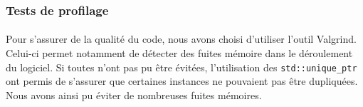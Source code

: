 \subsubsection{Tests de profilage}
\paragraph{}
Pour s'assurer de la qualité du code, nous avons choisi d'utiliser l'outil Valgrind. Celui-ci permet notamment de détecter des fuites mémoire dans le déroulement du logiciel. Si toutes n'ont pas pu être évitées, l'utilisation des \texttt{std::unique\_ptr} ont permis de s'assurer que certaines instances ne pouvaient pas être dupliquées. Nous avons ainsi pu éviter de nombreuses fuites mémoires.


